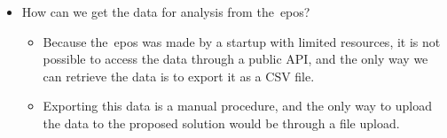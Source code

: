 \begin{itemize}
    \item How can we get the data for analysis from the~\acrshort{epos}?
    \begin{itemize}
        \item Because the~\acrshort{epos} was made by a startup with limited resources, it is not possible to access the
        data through a public API, and the only way we can retrieve the data is to export it as a CSV file.
        \item Exporting this data is a manual procedure, and the only way to upload the data to the proposed solution
        would be through a file upload.
    \end{itemize}
\end{itemize}
